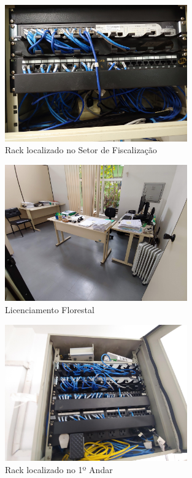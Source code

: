 \documentclass[	DIV=calc,%
							paper=a4,%
							fontsize=12pt,%
							onecolumn]{scrartcl}	 					%
\begin{document}
\begin{figure}[h!]
	\centering
	\includegraphics[width=0.7\textwidth]{figura11.jpg}
	\caption[Rack localizado no Setor de Fiscalização]{Rack localizado no Setor de Fiscalização}
	\label{figura11}
\end{figure}

\begin{figure}[h!]
	\centering
	\includegraphics[width=0.7\textwidth]{figura12.jpg}
	\caption[Licenciamento Florestal]{Licenciamento Florestal}
	\label{figura12}
\end{figure}

\begin{figure}[h!]
	\centering
	\includegraphics[width=0.7\textwidth]{figura14.jpg}
	\caption[Rack localizado no 1º Andar]{Rack localizado no 1º Andar}
	\label{figura14}
\end{figure}
\end{document}
